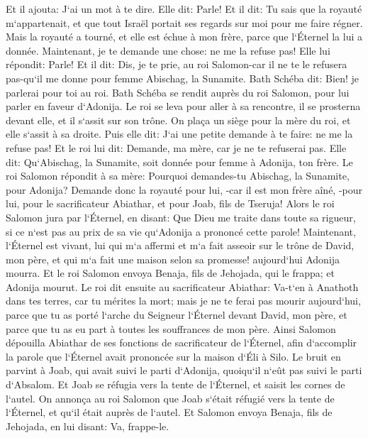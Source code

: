 \verse Et il ajouta: J`ai un mot à te dire. Elle dit: Parle! 
\verse Et il dit: Tu sais que la royauté m`appartenait, et que tout Israël portait ses regards sur moi pour me faire régner. Mais la royauté a tourné, et elle est échue à mon frère, parce que l`Éternel la lui a donnée. 
\verse Maintenant, je te demande une chose: ne me la refuse pas! Elle lui répondit: Parle! 
\verse Et il dit: Dis, je te prie, au roi Salomon-car il ne te le refusera pas-qu`il me donne pour femme Abischag, la Sunamite. 
\verse Bath Schéba dit: Bien! je parlerai pour toi au roi. 
\verse Bath Schéba se rendit auprès du roi Salomon, pour lui parler en faveur d`Adonija. Le roi se leva pour aller à sa rencontre, il se prosterna devant elle, et il s`assit sur son trône. On plaça un siège pour la mère du roi, et elle s`assit à sa droite. 
\verse Puis elle dit: J`ai une petite demande à te faire: ne me la refuse pas! Et le roi lui dit: Demande, ma mère, car je ne te refuserai pas. 
\verse Elle dit: Qu`Abischag, la Sunamite, soit donnée pour femme à Adonija, ton frère. 
\verse Le roi Salomon répondit à sa mère: Pourquoi demandes-tu Abischag, la Sunamite, pour Adonija? Demande donc la royauté pour lui, -car il est mon frère aîné, -pour lui, pour le sacrificateur Abiathar, et pour Joab, fils de Tseruja! 
\verse Alors le roi Salomon jura par l`Éternel, en disant: Que Dieu me traite dans toute sa rigueur, si ce n`est pas au prix de sa vie qu`Adonija a prononcé cette parole! 
\verse Maintenant, l`Éternel est vivant, lui qui m`a affermi et m`a fait asseoir sur le trône de David, mon père, et qui m`a fait une maison selon sa promesse! aujourd`hui Adonija mourra. 
\verse Et le roi Salomon envoya Benaja, fils de Jehojada, qui le frappa; et Adonija mourut. 
\verse Le roi dit ensuite au sacrificateur Abiathar: Va-t`en à Anathoth dans tes terres, car tu mérites la mort; mais je ne te ferai pas mourir aujourd`hui, parce que tu as porté l`arche du Seigneur l`Éternel devant David, mon père, et parce que tu as eu part à toutes les souffrances de mon père. 
\verse Ainsi Salomon dépouilla Abiathar de ses fonctions de sacrificateur de l`Éternel, afin d`accomplir la parole que l`Éternel avait prononcée sur la maison d`Éli à Silo. 
\verse Le bruit en parvint à Joab, qui avait suivi le parti d`Adonija, quoiqu`il n`eût pas suivi le parti d`Absalom. Et Joab se réfugia vers la tente de l`Éternel, et saisit les cornes de l`autel. 
\verse On annonça au roi Salomon que Joab s`était réfugié vers la tente de l`Éternel, et qu`il était auprès de l`autel. Et Salomon envoya Benaja, fils de Jehojada, en lui disant: Va, frappe-le. 
